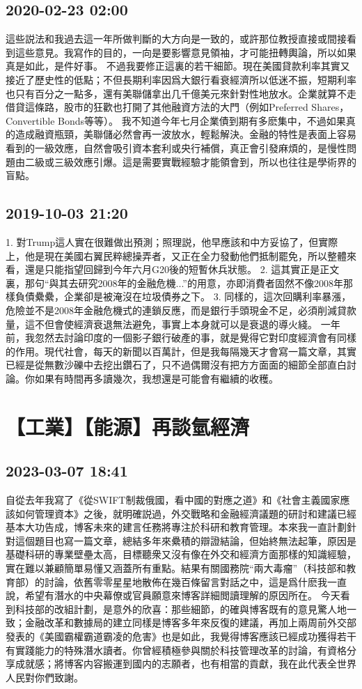 \documentclass[twocolumn]{ctexart}
\begin{document}
\subsection*{2020-02-23 02:00}

這些説法和我過去這一年所做判斷的大方向是一致的，或許那位教授直接或間接看到這些意見。我寫作的目的，一向是要影響意見領袖，才可能扭轉輿論，所以如果真是如此，是件好事。
不過我要修正這裏的若干細節。現在美國貸款利率其實又接近了歷史性的低點；不但長期利率因爲大銀行看衰經濟所以低迷不振，短期利率也只有百分之一點多，還有美聯儲拿出几千億美元來針對性地放水。企業就算不走借貸這條路，股市的狂歡也打開了其他融資方法的大門（例如Preferred Shares，Convertible Bonds等等）。
我不知道今年七月企業債到期有多麽集中，不過如果真的造成融資瓶頸，美聯儲必然會再一波放水，輕鬆解決。金融的特性是表面上容易看到的一級效應，自然會吸引資本套利或央行補償，真正會引發麻煩的，是慢性問題由二級或三級效應引爆。這是需要實戰經驗才能領會到，所以也往往是學術界的盲點。
\subsection*{2019-10-03 21:20}

1. 對Trump這人實在很難做出預測；照理説，他早應該和中方妥協了，但實際上，他是現在美國右翼民粹總操弄者，又正在全力發動他們抵制罷免，所以整體來看，還是只能指望回歸到今年六月G20後的短暫休兵狀態。 
2. 這其實正是正文裏，那句“與其去研究2008年的金融危機...”的用意，亦即消費者固然不像2008年那樣負債纍纍，企業卻是被淹沒在垃圾債券之下。 
3. 同樣的，這次回購利率暴漲，危險並不是2008年金融危機式的連鎖反應，而是銀行手頭現金不足，必須削減貸款量，這不但會使經濟衰退無法避免，事實上本身就可以是衰退的導火綫。 
一年前，我忽然去討論印度的一個影子銀行破產的事，就是覺得它對印度經濟會有同樣的作用。現代社會，每天的新聞以百萬計，但是我每隔幾天才會寫一篇文章，其實已經是從無數沙礫中去挖出鑽石了，只不過偶爾沒有把方方面面的細節全部直白討論。你如果有時間再多讀幾次，我想還是可能會有繼續的收穫。
\section*{【工業】【能源】再談氫經濟}
\subsection*{2023-03-07 18:41}

自從去年我寫了《從SWIFT制裁俄國，看中國的對應之道》和《社會主義國家應該如何管理資本》之後，就明確説過，外交戰略和金融經濟議題的研討和建議已經基本大功告成，博客未來的建言任務將專注於科研和教育管理。本來我一直計劃針對這個題目也寫一篇文章，總結多年來纍積的辯證結論，但始終無法起筆，原因是基礎科研的專業壁壘太高，目標聽衆又沒有像在外交和經濟方面那樣的知識經驗，實在難以兼顧簡單易懂又涵蓋所有重點。結果有關國務院“兩大毒瘤”（科技部和教育部）的討論，依舊零零星星地散佈在幾百條留言對話之中，這是爲什麽我一直說，希望有潛水的中央幕僚或官員願意來博客詳細閲讀理解的原因所在。
今天看到科技部的改組計劃，是意外的欣喜：那些細節，的確與博客既有的意見驚人地一致；金融改革和數據局的建立同樣是博客多年來反復的建議，再加上兩周前外交部發表的《美國霸權霸道霸凌的危害》也是如此，我覺得博客應該已經成功獲得若干有實踐能力的特殊潛水讀者。你曾經積極參與關於科技管理改革的討論，有資格分享成就感；將博客内容搬運到國内的志願者，也有相當的貢獻，我在此代表全世界人民對你們致謝。
\end{document}
